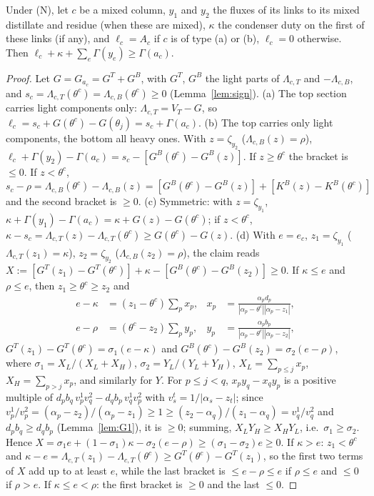 \documentclass[11pt,a4paper]{report}
\newcommand{\Lam}{\Lambda}
\begin{document}
\begin{lemma}\label{lem:G4}
Under (N), let $c$ be a mixed column, $y_1$ and $y_2$ the fluxes of its links to its mixed distillate and residue
(when these are mixed), $\kappa$ the condenser duty on the first of these links (if any), and $\ell_c=A_c$ if $c$ is of
type (a) or (b), $\ell_c=0$ otherwise. Then $\ell_c+\kappa+\sum_e\Gamma(y_e)\ge\Gamma(a_c)$.
\end{lemma}
\begin{proof}
Let $G=G_{a_c}=G^T+G^B$, with $G^T$, $G^B$ the light parts of $\Lam_{c,T}$ and $-\Lam_{c,B}$, and
$s_c=\Lam_{c,T}(\theta^c)=\Lam_{c,B}(\theta^c)\ge0$ (Lemma~\ref{lem:sign}).
(a) The top section carries light components only: $\Lam_{c,T}=V_T-G$, so $\ell_c=s_c+G(\theta^c)-G(\theta_j)=s_c+\Gamma(a_c)$.
(b) The top carries only light components, the bottom all heavy ones. With $z=\zeta_{y_2}$ ($\Lam_{c,B}(z)=\rho$),
$\ell_c+\Gamma(y_2)-\Gamma(a_c)=s_c-[G^B(\theta^c)-G^B(z)]$. If $z\ge\theta^c$ the bracket is $\le0$. If $z<\theta^c$,
$s_c-\rho=\Lam_{c,B}(\theta^c)-\Lam_{c,B}(z)=[G^B(\theta^c)-G^B(z)]+[K^B(z)-K^B(\theta^c)]$ and the second bracket is $\ge0$.
(c) Symmetric: with $z=\zeta_{y_1}$, $\kappa+\Gamma(y_1)-\Gamma(a_c)=\kappa+G(z)-G(\theta^c)$; if $z<\theta^c$,
$\kappa-s_c=\Lam_{c,T}(z)-\Lam_{c,T}(\theta^c)\ge G(\theta^c)-G(z)$.
(d) With $e=e_c$, $z_1=\zeta_{y_1}$ ($\Lam_{c,T}(z_1)=\kappa$), $z_2=\zeta_{y_2}$ ($\Lam_{c,B}(z_2)=\rho$), the claim reads
$X:=[G^T(z_1)-G^T(\theta^c)]+\kappa-[G^B(\theta^c)-G^B(z_2)]\ge0$. If $\kappa\le e$ and $\rho\le e$, then
$z_1\ge\theta^c\ge z_2$ and
\[\begin{aligned}
e-\kappa&=(z_1-\theta^c)\sum_px_p, & x_p&=\frac{\alpha_pd_p}{|\alpha_p-\theta^c||\alpha_p-z_1|},\\
e-\rho&=(\theta^c-z_2)\sum_py_p, & y_p&=\frac{\alpha_pb_p}{|\alpha_p-\theta^c||\alpha_p-z_2|},
\end{aligned}\]
$G^T(z_1)-G^T(\theta^c)=\sigma_1(e-\kappa)$ and $G^B(\theta^c)-G^B(z_2)=\sigma_2(e-\rho)$, where $\sigma_1=X_L/(X_L+X_H)$,
$\sigma_2=Y_L/(Y_L+Y_H)$, $X_L=\sum_{p\le j}x_p$, $X_H=\sum_{p>j}x_p$, and similarly for $Y$. For $p\le j<q$,
$x_py_q-x_qy_p$ is a positive multiple of $d_pb_q\,v^1_pv^2_q-d_qb_p\,v^1_qv^2_p$ with $v^t_s=1/|\alpha_s-z_t|$; since
$v^1_p/v^2_p=(\alpha_p-z_2)/(\alpha_p-z_1)\ge1\ge(z_2-\alpha_q)/(z_1-\alpha_q)=v^1_q/v^2_q$ and $d_pb_q\ge d_qb_p$
(Lemma~\ref{lem:G1}), it is $\ge0$; summing, $X_LY_H\ge X_HY_L$, i.e.\ $\sigma_1\ge\sigma_2$. Hence
$X=\sigma_1e+(1-\sigma_1)\kappa-\sigma_2(e-\rho)\ge(\sigma_1-\sigma_2)e\ge0$. If $\kappa>e$: $z_1<\theta^c$ and
$\kappa-e=\Lam_{c,T}(z_1)-\Lam_{c,T}(\theta^c)\ge G^T(\theta^c)-G^T(z_1)$, so the first two terms of $X$ add up to at least
$e$, while the last bracket is $\le e-\rho\le e$ if $\rho\le e$ and $\le0$ if $\rho>e$. If $\kappa\le e<\rho$: the first
bracket is $\ge0$ and the last $\le0$.
\end{proof}
\end{document}
